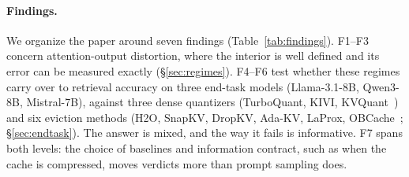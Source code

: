 \documentclass{article}
\theoremstyle{definition}
\begin{document}
\paragraph{Findings.}  We organize the paper around seven findings (Table~\ref{tab:findings}).  F1--F3 concern attention-output distortion, where the interior is well defined and its error can be measured exactly (\S\ref{sec:regimes}).  F4--F6 test whether these regimes carry over to retrieval accuracy on three end-task models (Llama-3.1-8B, Qwen3-8B, Mistral-7B), against three dense quantizers (TurboQuant, KIVI, KVQuant~\citep{zandieh2025turboquant,liu2024kivi,hooper2024kvquant}) and six eviction methods (H2O, SnapKV, DropKV, Ada-KV, LaProx, OBCache~\citep{zhang2023h2o,li2024snapkv,zhang2026dropkv,feng2024adakv,mai2026laprox,gu2026obcache}; \S\ref{sec:endtask}).  The answer is mixed, and the way it fails is informative.  F7 spans both levels: the choice of baselines and information contract, such as when the cache is compressed, moves verdicts more than prompt sampling does.
\end{document}

